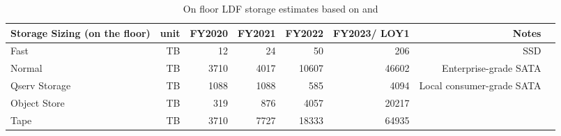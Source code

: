 \tiny \begin{longtable} { |p{}  |r  |r  |r  |r  |r  |r  |r |} 
\caption{On floor LDF storage estimates based on  and 
 \label{tab:storageFloor}}\\ 
\hline 
\textbf{Storage Sizing (on the floor)}&\textbf{unit}&\textbf{FY2020}&\textbf{FY2021}&\textbf{FY2022}&\textbf{FY2023/ LOY1}&\textbf{Notes} \\ \hline
{Fast}&{TB}&{12}&{24}&{50}&{206}&{SSD} \\ \hline
{Normal}&{TB}&{3710}&{4017}&{10607}&{46602}&{Enterprise-grade SATA} \\ \hline
{Qserv Storage}&{TB}&{1088}&{1088}&{585}&{4094}&{Local consumer-grade SATA} \\ \hline
{Object Store}&{TB}&{319}&{876}&{4057}&{20217}& \\ \hline
{Tape}&{TB}&{3710}&{7727}&{18333}&{64935}& \\ \hline
\end{longtable} \normalsize
